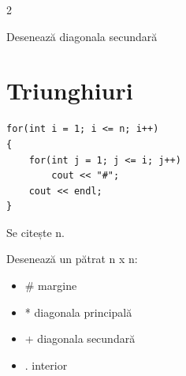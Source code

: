 \documentclass[11pt]{article}
\begin{document}
\begin{multicols}{2}
\begin{trybox}
Desenează diagonala secundară
\end{trybox}

\section*{Triunghiuri}

\begin{examplebox}
\begin{lstlisting}
for(int i = 1; i <= n; i++)
{
    for(int j = 1; j <= i; j++)
        cout << "#";
    cout << endl;
}
\end{lstlisting}
\end{examplebox}

\begin{bossbox}
Se citește n.

Desenează un pătrat n x n:
\begin{itemize}
\item \# margine
\item * diagonala principală
\item + diagonala secundară
\item . interior
\end{itemize}
\end{bossbox}

\end{multicols}
\end{document}
